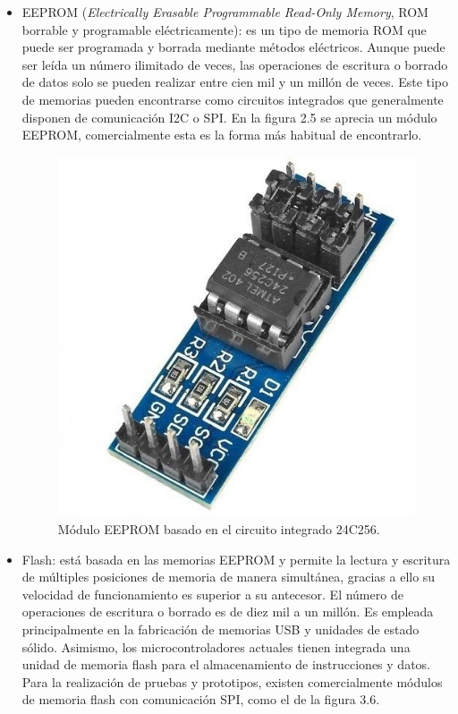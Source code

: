 \begin{itemize}
	\item EEPROM (\textit{Electrically Erasable Programmable Read-Only Memory}, ROM borrable y programable eléctricamente): es un tipo de memoria ROM que puede ser programada y borrada mediante métodos eléctricos. Aunque puede ser leída un número ilimitado de veces, las operaciones de escritura o borrado de datos solo se pueden realizar entre cien mil y un millón de veces. Este tipo de memorias pueden encontrarse como circuitos integrados que generalmente disponen de comunicación I2C o SPI. En la figura 2.5 se aprecia un módulo EEPROM, comercialmente esta es la forma más habitual de encontrarlo.
	\begin{figure}[h]
		\centering
		\includegraphics[scale=0.35]{./Figures/eeprom.jpg}
		\caption{Módulo EEPROM basado en el circuito integrado 24C256.}
		\label{fig:cuadradoAzul}
	\end{figure}
	\item Flash: está basada en las memorias EEPROM y permite la lectura y escritura de múltiples posiciones de memoria de manera simultánea, gracias a ello su velocidad de funcionamiento es superior a su antecesor. El número de operaciones de escritura o borrado es de diez mil a un millón. Es empleada principalmente en la fabricación de memorias USB y unidades de estado sólido. Asimismo, los microcontroladores actuales tienen integrada una unidad de memoria flash para el almacenamiento de instrucciones y datos. Para la realización de pruebas y prototipos, existen comercialmente módulos de memoria flash con comunicación SPI, como el de la figura 3.6.

\end{itemize}
